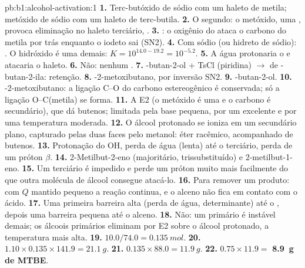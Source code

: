 \begin{solution}{pb:b1:alcohol-activation:1}
\textbf{1.} Terc-butóxido de sódio com um haleto de metila; metóxido de
sódio com um haleto de terc-butila.
\textbf{2.} O segundo: o metóxido, uma , provoca eliminação no
haleto terciário, .
\textbf{3.} : o oxigênio do
 ataca o carbono do metila por trás enquanto o iodeto sai (SN2).
\textbf{4.} Com sódio (ou hidreto de sódio): . O hidróxido é uma  demais: $K = 10^{14.0 -
19.2} = 10^{-5.2}$.
\textbf{5.} A água protonaria o  e atacaria o haleto.
\textbf{6.} Não: nenhum .
\textbf{7.} -butan-2-ol + TsCl (piridina) $\to$  de
-butan-2-ila: retenção.
\textbf{8.} -2-metoxibutano, por inversão SN2.
\textbf{9.} -butan-2-ol.
\textbf{10.} -2-metoxibutano: a ligação C--O do carbono
estereogênico é conservada; só a ligação O--C(metila) se forma.
\textbf{11.} A E2 (o metóxido é uma  e o carbono é secundário),
que dá butenos; limitada pela base pequena, por um excelente  e por uma temperatura moderada.
\textbf{12.} O álcool protonado se ioniza em um  secundário
plano, capturado pelas duas faces pelo metanol: éter racêmico,
acompanhado de butenos.
\textbf{13.} Protonação do OH, perda de água (lenta) até o 
terciário, perda de um próton $\beta$.
\textbf{14.} 2-Metilbut-2-eno (majoritário, trissubstituído) e
2-metilbut-1-eno.
\textbf{15.} Um  terciário é impedido e perde um próton muito
mais facilmente do que outra molécula de álcool consegue atacá-lo.
\textbf{16.} Para remover um produto: com $Q$ mantido pequeno a reação
continua, e o alceno não fica em contato com o ácido.
\textbf{17.} Uma primeira barreira alta (perda de água, determinante) até
o , depois uma barreira pequena até o alceno.
\textbf{18.} Não: um  primário é instável demais; os álcoois
primários eliminam por E2 sobre o álcool protonado, a temperatura mais alta.
\textbf{19.} $10.0/74.0 = \qty{0.135}{mol}$.
\textbf{20.} $1.10 \times 0.135 \times 141.9 = \qty{21.1}{g}$.
\textbf{21.} $0.135 \times 88.0 = \qty{11.9}{g}$.
\textbf{22.} $0.75 \times 11.9 =$ \textbf{\qty{8.9}{g} de MTBE}.
\end{solution}
